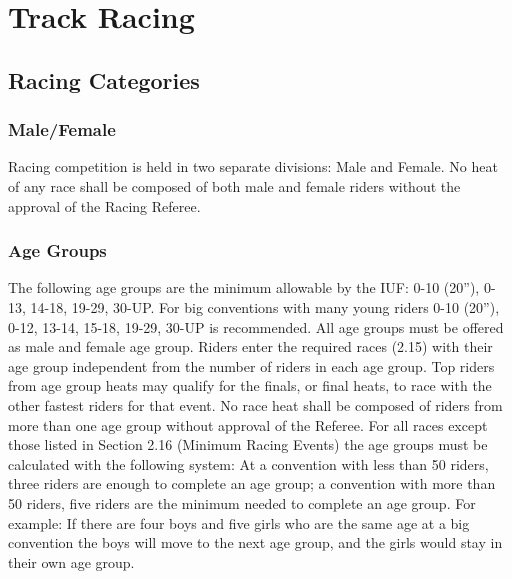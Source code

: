 \chapter{Track Racing}

\section{Racing Categories}

\subsection{Male/Female}
Racing competition is held in two separate divisions: Male and Female. No heat of any race shall
 be composed of both male and female riders without the approval of the Racing Referee.

\subsection{Age Groups}
The following age groups are the minimum allowable by the IUF: 0-10 (20”), 0-13, 14-18, 19-29, 30-UP. For big 
conventions with many young riders 0-10 (20”), 0-12, 13-14, 15-18, 19-29, 30-UP is recommended. All age groups 
must be offered as male and female age group. Riders enter the required races (2.15) with their age group independent 
from the number of riders in each age group. Top riders from age group heats may qualify for the finals, or final heats, 
to race with the other fastest riders for that event. No race heat shall be composed of riders from more than one age 
group without approval of the Referee.
For all races except those listed in Section 2.16 (Minimum Racing Events) the age groups must be calculated with the 
following system: At a convention with less than 50 riders, three riders are enough to complete an age group; a 
convention with more than 50 riders, five riders are the minimum needed to complete an age group. For example: If 
there are four boys and five girls who are the same age at a big convention the boys will move to the next age group, 
and the girls would stay in their own age group. 